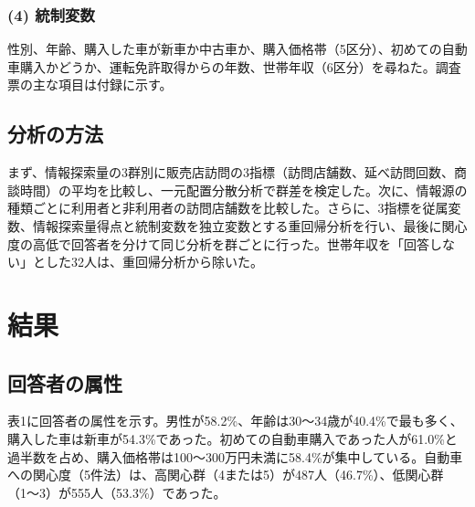 \subsubsection*{(4) 統制変数}

性別、年齢、購入した車が新車か中古車か、購入価格帯（5区分）、初めての自動車購入かどうか、運転免許取得からの年数、世帯年収（6区分）を尋ねた。調査票の主な項目は付録に示す。

\subsection{分析の方法}

まず、情報探索量の3群別に販売店訪問の3指標（訪問店舗数、延べ訪問回数、商談時間）の平均を比較し、一元配置分散分析で群差を検定した。次に、情報源の種類ごとに利用者と非利用者の訪問店舗数を比較した。さらに、3指標を従属変数、情報探索量得点と統制変数を独立変数とする重回帰分析を行い、最後に関心度の高低で回答者を分けて同じ分析を群ごとに行った。世帯年収を「回答しない」とした32人は、重回帰分析から除いた。

\section{結果}

\subsection{回答者の属性}

表1に回答者の属性を示す。男性が58.2\%、年齢は30〜34歳が40.4\%で最も多く、購入した車は新車が54.3\%であった。初めての自動車購入であった人が61.0\%と過半数を占め、購入価格帯は100〜300万円未満に58.4\%が集中している。自動車への関心度（5件法）は、高関心群（4または5）が487人（46.7\%）、低関心群（1〜3）が555人（53.3\%）であった。

